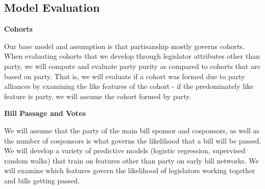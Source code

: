 \subsection{Model Evaluation}

\textbf{Cohorts}

Our base model and assumption is that partisanship mostly governs cohorts. 
When evaluating cohorts that we develop through legislator attributes other 
than party, we will compute and evaluate party purity as compared to cohorts 
that are based on party. That is, we will evaluate if a cohort was formed 
due to party alliances by examining the like features of the cohort - if the 
predominately like feature is party, we will assume the cohort formed by party.

\textbf{Bill Passage and Votes}

We will assume that the party of the main bill sponsor and cosponsors, as well
as the number of cosponsors is what governs the likelihood that a bill will be
passed. We will develop a variety of predictive models (logistic regression,
supervised random walks) that train on features other than party on early bill
networks. We will examine which features govern the likelihood of legislators
working together and  bills getting passed.
